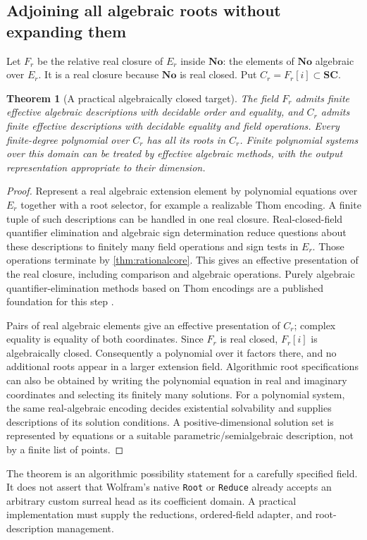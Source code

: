 \documentclass[11pt,letterpaper]{article}
\numberwithin{equation}{section}
\newtheorem{theorem}{Theorem}[section]
\theoremstyle{definition}
\theoremstyle{remark}\newtheorem{remark}[theorem]{Remark}
\newcommand{\No}{\mathbf{No}}
\newcommand{\SC}{\mathbf{SC}}
\begin{document}
\subsection{Adjoining all algebraic roots without expanding them}
Let $F_r$ be the relative real closure of $E_r$ inside $\No$: the elements of
$\No$ algebraic over $E_r$. It is a real closure because $\No$ is real closed.
Put $C_r=F_r[i]\subset\SC$.

\begin{theorem}[A practical algebraically closed target]\label{thm:algcore}
The field $F_r$ admits finite effective algebraic descriptions with decidable
order and equality, and $C_r$ admits finite effective descriptions with
decidable equality and field operations. Every finite-degree polynomial over
$C_r$ has all its roots in $C_r$. Finite polynomial systems over this domain
can be treated by effective algebraic methods, with the output representation
appropriate to their dimension.
\end{theorem}
\begin{proof}
Represent a real algebraic extension element by polynomial equations over
$E_r$ together with a root selector, for example a realizable Thom encoding.
A finite tuple of such descriptions can be handled in one real closure.
Real-closed-field quantifier elimination and algebraic sign determination
reduce questions about these descriptions to finitely many field operations
and sign tests in $E_r$. Those operations terminate by
\cref{thm:rationalcore}. This gives an effective presentation of the real
closure, including comparison and algebraic operations. Purely algebraic
quantifier-elimination methods based on Thom encodings are a published
foundation for this step \cite{PerrucciRoy}.

Pairs of real algebraic elements give an effective presentation of $C_r$;
complex equality is equality of both coordinates. Since $F_r$ is real closed,
$F_r[i]$ is algebraically closed. Consequently a polynomial over it factors
there, and no additional roots appear in a larger extension field. Algorithmic
root specifications can also be obtained by writing the polynomial equation
in real and imaginary coordinates and selecting its finitely many solutions.
For a polynomial system, the same real-algebraic encoding decides existential
solvability and supplies descriptions of its solution conditions. A
positive-dimensional solution set is represented by equations or a suitable
parametric/semialgebraic description, not by a finite list of points.
\end{proof}
The theorem is an algorithmic possibility statement for a carefully specified
field. It does not assert that Wolfram's native \texttt{Root} or
\texttt{Reduce} already accepts an arbitrary custom surreal head as its
coefficient domain. A practical implementation must supply the reductions,
ordered-field adapter, and root-description management.
\end{document}
